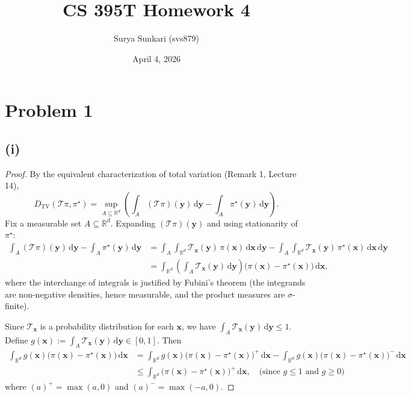 \documentclass[12pt]{article}
\begin{document}
\title{CS 395T Homework 4}
\author{Surya Sunkari (svs879)}
\date{April 4, 2026}

\maketitle

\section*{Problem 1}

\subsection*{(i)}

\begin{proof}
By the equivalent characterization of total variation (Remark 1, Lecture 14),
\[
D_{\mathrm{TV}}(\mathcal{T}\pi, \pi^\star)
= \sup_{A \subseteq \mathbb{R}^d} \left( \int_{A} (\mathcal{T}\pi)(\mathbf{y}) \,\mathrm{d}\mathbf{y} - \int_{A} \pi^\star(\mathbf{y}) \,\mathrm{d}\mathbf{y} \right).
\]
Fix a measurable set $A \subseteq \mathbb{R}^d$. Expanding $(\mathcal{T}\pi)(\mathbf{y})$ and using stationarity of $\pi^\star$:
\begin{align*}
\int_{A} (\mathcal{T}\pi)(\mathbf{y}) \,\mathrm{d}\mathbf{y} - \int_{A} \pi^\star(\mathbf{y}) \,\mathrm{d}\mathbf{y}
&= \int_{A} \int_{\mathbb{R}^d} \mathcal{T}_{\mathbf{x}}(\mathbf{y})\, \pi(\mathbf{x}) \,\mathrm{d}\mathbf{x} \,\mathrm{d}\mathbf{y} - \int_{A} \int_{\mathbb{R}^d} \mathcal{T}_{\mathbf{x}}(\mathbf{y})\, \pi^\star(\mathbf{x}) \,\mathrm{d}\mathbf{x} \,\mathrm{d}\mathbf{y} \\
&= \int_{\mathbb{R}^d} \left( \int_{A} \mathcal{T}_{\mathbf{x}}(\mathbf{y}) \,\mathrm{d}\mathbf{y} \right) \bigl(\pi(\mathbf{x}) - \pi^\star(\mathbf{x})\bigr) \,\mathrm{d}\mathbf{x},
\end{align*}
where the interchange of integrals is justified by Fubini's theorem (the integrands are non-negative densities, hence measurable, and the product measures are $\sigma$-finite).

Since $\mathcal{T}_{\mathbf{x}}$ is a probability distribution for each $\mathbf{x}$, we have $\int_{A} \mathcal{T}_{\mathbf{x}}(\mathbf{y}) \,\mathrm{d}\mathbf{y} \leq 1$. Define $g(\mathbf{x}) := \int_{A} \mathcal{T}_{\mathbf{x}}(\mathbf{y}) \,\mathrm{d}\mathbf{y} \in [0, 1]$. Then
\begin{align*}
\int_{\mathbb{R}^d} g(\mathbf{x}) \bigl(\pi(\mathbf{x}) - \pi^\star(\mathbf{x})\bigr) \,\mathrm{d}\mathbf{x}
&= \int_{\mathbb{R}^d} g(\mathbf{x}) \bigl(\pi(\mathbf{x}) - \pi^\star(\mathbf{x})\bigr)^+ \,\mathrm{d}\mathbf{x} - \int_{\mathbb{R}^d} g(\mathbf{x}) \bigl(\pi(\mathbf{x}) - \pi^\star(\mathbf{x})\bigr)^- \,\mathrm{d}\mathbf{x} \\
&\leq \int_{\mathbb{R}^d} \bigl(\pi(\mathbf{x}) - \pi^\star(\mathbf{x})\bigr)^+ \,\mathrm{d}\mathbf{x}, \quad \text{(since } g \leq 1 \text{ and } g \geq 0\text{)}
\end{align*}
where $(a)^+ = \max(a, 0)$ and $(a)^- = \max(-a, 0)$.


\end{proof}
\end{document}
